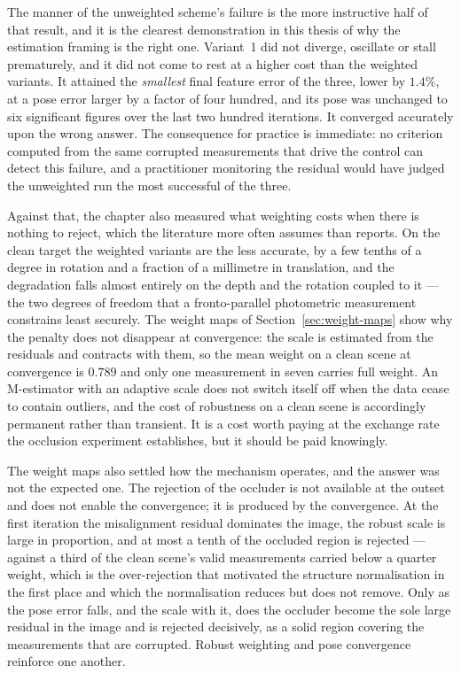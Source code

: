 The manner of the unweighted scheme's failure is the more instructive half of
that result, and it is the clearest demonstration in this thesis of why the
estimation framing is the right one. Variant~1 did not diverge, oscillate or
stall prematurely, and it did not come to rest at a higher cost than the
weighted variants. It attained the \emph{smallest} final feature error of the
three, lower by $1.4\%$, at a pose error larger by a factor of four hundred,
and its pose was unchanged to six significant figures over the last two
hundred iterations. It converged accurately upon the wrong answer. The
consequence for practice is immediate: no criterion computed from the same
corrupted measurements that drive the control can detect this failure, and a
practitioner monitoring the residual would have judged the unweighted run the
most successful of the three.

Against that, the chapter also measured what weighting costs when there is
nothing to reject, which the literature more often assumes than reports. On
the clean target the weighted variants are the less accurate, by a few tenths
of a degree in rotation and a fraction of a millimetre in translation, and the
degradation falls almost entirely on the depth and the rotation coupled to it
--- the two degrees of freedom that a fronto-parallel photometric measurement
constrains least securely. The weight maps of Section~\ref{sec:weight-maps}
show why the penalty does not disappear at convergence: the scale is estimated
from the residuals and contracts with them, so the mean weight on a clean
scene at convergence is $0.789$ and only one measurement in seven carries
full weight. An M-estimator with an adaptive scale does not switch itself off
when the data cease to contain outliers, and the cost of robustness on a clean
scene is accordingly permanent rather than transient. It is a cost worth
paying at the exchange rate the occlusion experiment establishes, but it
should be paid knowingly.

The weight maps also settled how the mechanism operates, and the answer was
not the expected one. The rejection of the occluder is not available at the
outset and does not enable the convergence; it is produced by the convergence.
At the first iteration the misalignment residual dominates the image, the
robust scale is large in proportion, and at most a tenth of the occluded
region is rejected --- against a third of the clean scene's valid measurements
carried below a quarter weight, which is the over-rejection that motivated the
structure normalisation in the first place and which the normalisation reduces
but does not remove. Only as the pose error falls, and the scale with it, does
the occluder become the sole large residual in the image and is rejected
decisively, as a solid region covering the measurements that are corrupted.
Robust weighting and pose convergence reinforce one another.

